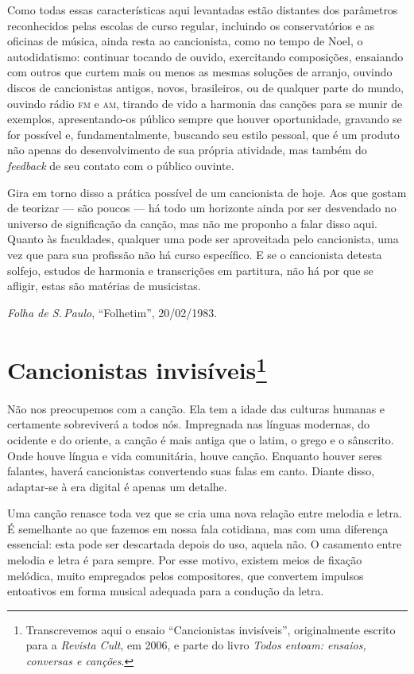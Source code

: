 Como todas essas características aqui levantadas estão distantes dos
parâmetros reconhecidos pelas escolas de curso regular, incluindo os
conservatórios e as oficinas de música, ainda resta ao cancionista,
como no tempo de Noel, o autodidatismo: continuar tocando de ouvido,
exercitando composições, ensaiando com outros que curtem mais ou menos
as mesmas soluções de arranjo, ouvindo discos de cancionistas antigos,
novos, brasileiros, ou de qualquer parte do mundo, ouvindo rádio \textsc{fm} e
\textsc{am}, tirando de vido a harmonia das canções para se munir de exemplos,
apresentando-os público sempre que houver oportunidade, gravando se for
possível e, fundamentalmente, buscando seu estilo pessoal, que é um
produto não apenas do desenvolvimento de sua própria atividade, mas
também do \textit{feedback} de seu contato com o público ouvinte.

Gira em torno disso a prática possível de um cancionista de hoje. Aos
que gostam de teorizar --- são poucos --- há todo um horizonte ainda por ser
desvendado no universo de significação da canção, mas não me proponho a
falar disso aqui. Quanto às faculdades, qualquer uma pode ser
aproveitada pelo cancionista, uma vez que para sua profissão não há
curso específico. E se o cancionista detesta solfejo, estudos de
harmonia e transcrições em partitura, não há por que se afligir, estas
são matérias de musicistas.

\textit{Folha de S.\,Paulo}, ``Folhetim'', 20/02/1983.


\chapter{Cancionistas invisíveis\footnote{Transcrevemos aqui o ensaio ``Cancionistas invisíveis'', 
originalmente escrito para a \textit{Revista Cult}, em 2006, e parte do livro \textit{Todos entoam: ensaios, 
conversas e canções}.}}


Não nos preocupemos com a canção. Ela tem a idade das culturas humanas e
certamente sobreviverá a todos nós. Impregnada nas línguas modernas, do
ocidente e do oriente, a canção é mais antiga que o latim, o grego e o
sânscrito. Onde houve língua e vida comunitária, houve canção. Enquanto
houver seres falantes, haverá cancionistas convertendo suas falas em
canto. Diante disso, adaptar-se à era digital é apenas um detalhe.

Uma canção renasce toda vez que se cria uma nova relação entre melodia e
letra. É semelhante ao que fazemos em nossa fala cotidiana, mas com uma
diferença essencial: esta pode ser descartada depois do uso, aquela não.
O casamento entre melodia e letra é para sempre. Por esse motivo,
existem meios de fixação melódica, muito empregados pelos compositores,
que convertem impulsos entoativos em forma musical adequada para a
condução da letra.

